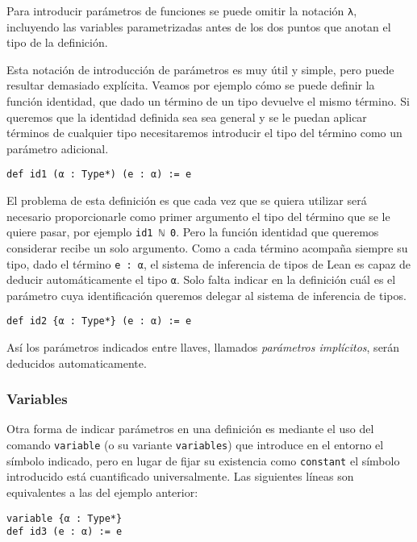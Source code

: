 Para introducir parámetros de funciones se puede omitir la notación
\lstinline{λ}, incluyendo las variables parametrizadas antes de los dos puntos
que anotan el tipo de la definición.

Esta notación de introducción de parámetros es muy útil y simple, pero puede
resultar demasiado explícita. Veamos por ejemplo cómo se puede definir la
función identidad, que dado un término de un tipo devuelve el mismo término.
Si queremos que la identidad definida sea sea general y se le puedan aplicar términos
de cualquier tipo necesitaremos introducir el tipo del término como un parámetro
adicional.

\begin{lstlisting}
def id1 (α : Type*) (e : α) := e
\end{lstlisting}

El problema de esta definición es que cada vez que se quiera utilizar será
necesario proporcionarle como primer argumento el tipo del término que se le
quiere pasar, por ejemplo \lstinline{id1 ℕ 0}.
Pero la función identidad que queremos considerar recibe un solo argumento.
Como a cada término acompaña siempre su tipo, dado el término \lstinline{e : α},
el sistema de inferencia de tipos de Lean es capaz de deducir automáticamente el
tipo \lstinline{α}. Solo falta indicar en la definición cuál es el parámetro
cuya identificación queremos delegar al sistema de inferencia de tipos.

\begin{lstlisting}
def id2 {α : Type*} (e : α) := e
\end{lstlisting}

Así los parámetros indicados entre llaves, llamados \textit{parámetros
	implícitos}, serán deducidos automaticamente.

\subsubsection*{Variables}%

Otra forma de indicar parámetros en una definición es mediante el uso del
comando \lstinline{variable} (o su variante \lstinline{variables}) que introduce
en el entorno el símbolo indicado, pero en lugar de fijar su existencia como
\lstinline{constant} el símbolo introducido está \guillemotleft cuantificado
universalmente\guillemotright. Las siguientes líneas son equivalentes a las del
ejemplo anterior:

\begin{lstlisting}
variable {α : Type*}
def id3 (e : α) := e
\end{lstlisting}

